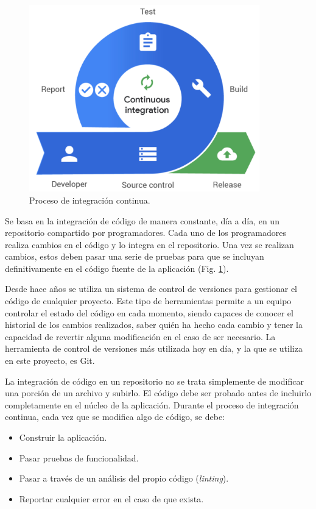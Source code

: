 \begin{figure}
  \centerline{\includegraphics[width=10cm]{figuras/ci}}
  \caption{Proceso de integración continua.\cite{img:ci}}
  \label{fig:ci}
\end{figure}

Se basa en la integración de código de manera constante, día a día, en un repositorio compartido por programadores. Cada uno de los programadores realiza cambios en el código y lo integra en el repositorio. Una vez se realizan cambios, estos deben pasar una serie de pruebas para que se incluyan definitivamente en el código fuente de la aplicación (Fig. \ref{fig:ci}).

Desde hace años se utiliza un sistema de control de versiones para gestionar el código de cualquier proyecto. Este tipo de herramientas permite a un equipo controlar el estado del código en cada momento, siendo capaces de conocer el historial de los cambios realizados, saber quién ha hecho cada cambio y tener la capacidad de revertir alguna modificación en el caso de ser necesario. La herramienta de control de versiones más utilizada hoy en día, y la que se utiliza en este proyecto, es Git\cite{git}.

La integración de código en un repositorio no se trata simplemente de modificar una porción de un archivo y subirlo. El código debe ser probado antes de incluirlo completamente en el núcleo de la aplicación. Durante el proceso de integración continua, cada vez que se modifica algo de código, se debe:

\begin{itemize}
  \item Construir la aplicación.
  \item Pasar pruebas de funcionalidad.
  \item Pasar a través de un análisis del propio código (\textit{linting}).
  \item Reportar cualquier error en el caso de que exista.
\end{itemize}

